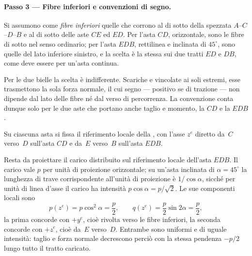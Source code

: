\begin{esercizio}
\begin{svolgimento}
		\paragraph{Passo 3 --- Fibre inferiori e convenzioni di segno.}
		
		Si assumono come \emph{fibre inferiori} quelle che corrono al di
		sotto della spezzata $A$--$C$--$D$--$B$ e al di sotto delle aste
		$CE$ ed $ED$. Per l'asta $CD$, orizzontale, sono le fibre di
		sotto nel senso ordinario; per l'asta $EDB$, rettilinea e
		inclinata di $45^{\circ}$, sono quelle del lato inferiore
		sinistro, e la scelta è la stessa sui due tratti $ED$ e $DB$,
		come deve essere per un'asta continua.
		
		\begin{oss}
			Per le due bielle la scelta è indifferente. Scariche e
			vincolate ai soli estremi, esse trasmettono la sola forza
			normale, il cui segno --- positivo se di trazione --- non
			dipende dal lato delle fibre né dal verso di percorrenza.
			La convenzione conta dunque solo per le due aste che portano
			anche taglio e momento, la $CD$ e la $EDB$.
		\end{oss}
		
		Su ciascuna asta si fissa il riferimento locale della
		, con l'asse $z^e$ diretto da~$C$ verso~$D$
		sull'asta $CD$ e da~$E$ verso~$B$ sull'asta $EDB$.
		
		Resta da proiettare il carico distribuito sul riferimento locale
		dell'asta $EDB$. Il carico vale $p$ per unità di proiezione
		orizzontale; su un'asta inclinata di $\alpha = 45^{\circ}$ la
		lunghezza di trave corrispondente all'unità di proiezione è
		$1/\cos\alpha$, sicché per unità di linea d'asse il carico ha
		intensità $p\cos\alpha = p/\sqrt2$. Le sue componenti locali sono
		\[
		p(z^e) = p\cos^{2}\alpha = \frac{p}{2},
		\qquad
		q(z^e) = \frac{p}{2}\sin 2\alpha = \frac{p}{2},
		\]
		la prima concorde con $+y^e$, cioè rivolta verso le fibre
		inferiori, la seconda concorde con $+z^e$, cioè da~$E$ verso~$D$.
		Entrambe sono uniformi e di uguale intensità: taglio e forza
		normale decrescono perciò con la stessa pendenza $-p/2$ lungo
		tutto il tratto caricato.
		
		


\end{svolgimento}
\end{esercizio}
